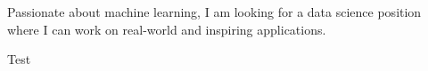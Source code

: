 

\begin{cvparagraph}

Passionate about machine learning, I am looking for a data science position where I can work on real-world and inspiring applications.

Test

\end{cvparagraph}
